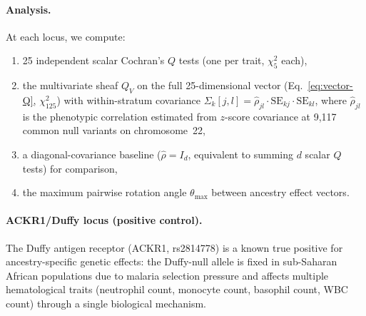 \documentclass[11pt]{article}
\begin{document}
\paragraph{Analysis.}
At each locus, we compute:
\begin{enumerate}
    \item 25 independent scalar Cochran's $Q$ tests (one per trait, $\chi^2_5$ each),
    \item the multivariate sheaf $Q_V$ on the full 25-dimensional vector (Eq.~\ref{eq:vector-Q}, $\chi^2_{125}$) with within-stratum covariance $\Sigma_k[j,l] = \hat{\rho}_{jl} \cdot \mathrm{SE}_{kj} \cdot \mathrm{SE}_{kl}$, where $\hat{\rho}_{jl}$ is the phenotypic correlation estimated from $z$-score covariance at 9{,}117 common null variants on chromosome~22,
    \item a diagonal-covariance baseline ($\hat{\rho} = I_d$, equivalent to summing $d$ scalar $Q$ tests) for comparison,
    \item the maximum pairwise rotation angle $\theta_{\max}$ between ancestry effect vectors.
\end{enumerate}

\paragraph{ACKR1/Duffy locus (positive control).}
The Duffy antigen receptor (ACKR1, rs2814778) is a known true positive for ancestry-specific genetic effects: the Duffy-null allele is fixed in sub-Saharan African populations due to malaria selection pressure and affects multiple hematological traits (neutrophil count, monocyte count, basophil count, WBC count) through a single biological mechanism.
\end{document}
